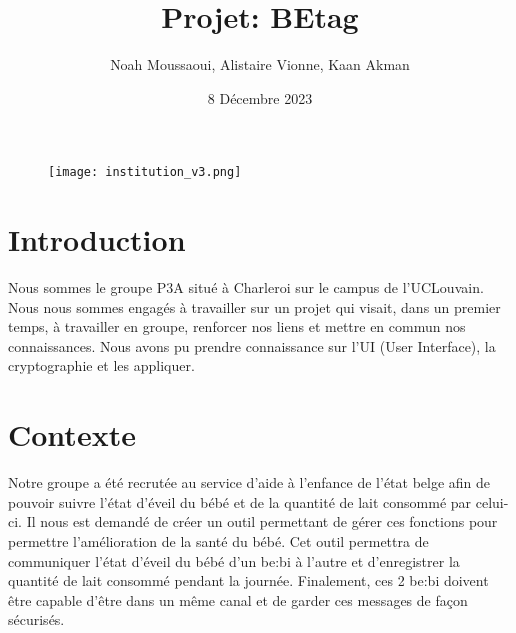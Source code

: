 \documentclass [11pt]{article}
\title{Projet: BEtag}
\author{Noah Moussaoui, Alistaire Vionne, Kaan Akman}
\date{8 Décembre 2023}
\begin{document}
\maketitle
\begin{figure}[h]
    \centering
    \texttt{[image: institution\_v3.png]}
    \label{ucl}
\end{figure}

\section{Introduction}
Nous sommes le groupe P3A situé à Charleroi sur le campus de l’UCLouvain. Nous nous sommes
engagés à travailler sur un projet qui visait, dans un premier temps, à travailler en groupe, renforcer nos
liens et mettre en commun nos connaissances. Nous avons pu prendre connaissance sur l'UI (User Interface), la cryptographie et les appliquer.

\section{Contexte}
Notre groupe a été recrutée au service d’aide à l’enfance de l’état belge afin de pouvoir suivre l’état d’éveil du bébé et de la quantité de lait consommé par celui-ci. Il nous est demandé de créer un outil permettant de gérer ces fonctions pour permettre l’amélioration de la santé du bébé. Cet outil permettra de communiquer l’état d’éveil du bébé d’un be\string:bi à l’autre et d’enregistrer la quantité de lait consommé pendant la journée. Finalement, ces 2 be\string:bi doivent être capable d’être dans un même canal et de garder ces messages de façon sécurisés.
\newpage
\end{document}
